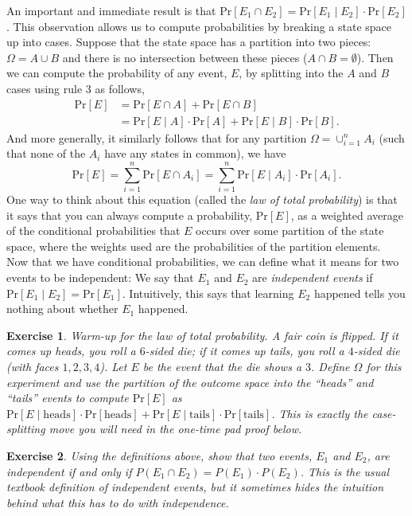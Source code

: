 \documentclass[12pt]{article}
\newcommand{\pr}[1]{\text{Pr}\left[#1\right]}
\newtheorem{exercise}{Exercise}
\theoremstyle{definition}
\theoremstyle{remark}
\theoremstyle{definition}
\begin{document}
An important and immediate result is that $\pr{E_1\cap E_2} = \pr{E_1\mid E_2}\cdot \pr{E_2}$. This observation allows us to compute probabilities by breaking a state space up into cases. Suppose that the state space has a partition into two pieces: $\Omega = A\cup B$ and there is no intersection between these pieces ($A\cap B = \emptyset$). Then we can compute the probability of any event, $E$, by splitting into the $A$ and $B$ cases using rule 3 as follows,
\begin{align*}
\pr{E} &=  \pr{E\cap A} + \pr{E\cap B}\\
&= \pr{E\mid A}\cdot \pr{A} + \pr{E\mid B}\cdot\pr{B}.
\end{align*}
And more generally, it similarly follows that for any partition $\Omega = \cup_{i=1}^nA_i$ (such that none of the $A_i$ have any states in common), we have $$\pr{E} = \sum_{i=1}^n\pr{E\cap A_i} = \sum_{i=1}^n\pr{E\mid A_i}\cdot \pr{A_i}.$$
One way to think about this equation (called the \emph{law of total probability}) is that it says that you can always compute a probability, $\pr{E}$, as a weighted average of the conditional probabilities that $E$ occurs over some partition of the state space, where the weights used are the probabilities of the partition elements.\\

Now that we have conditional probabilities, we can define what it means for two events to be independent: We say that $E_1$ and $E_2$ are \emph{independent events} if $\pr{E_1\mid E_2} = \pr{E_1}$. Intuitively, this says that learning $E_2$ happened tells you nothing about whether $E_1$ happened.

\begin{exercise}\label{ex:total-prob-warmup}
Warm-up for the law of total probability. A fair coin is flipped. If it comes up heads, you roll a $6$-sided die; if it comes up tails, you roll a $4$-sided die (with faces $1,2,3,4$). Let $E$ be the event that the die shows a $3$. Define $\Omega$ for this experiment and use the partition of the outcome space into the ``heads'' and ``tails'' events to compute $\pr{E}$ as $\pr{E\mid \text{heads}}\cdot\pr{\text{heads}} + \pr{E\mid \text{tails}}\cdot\pr{\text{tails}}$. This is exactly the case-splitting move you will need in the one-time pad proof below.
\end{exercise}

\begin{exercise}
Using the definitions above, show that two events, $E_1$ and $E_2$, are independent if and only if $P(E_1\cap E_2) = P(E_1)\cdot P(E_2)$. This is the usual textbook definition of independent events, but it sometimes hides the intuition behind what this has to do with independence.
\end{exercise}
\end{document}
